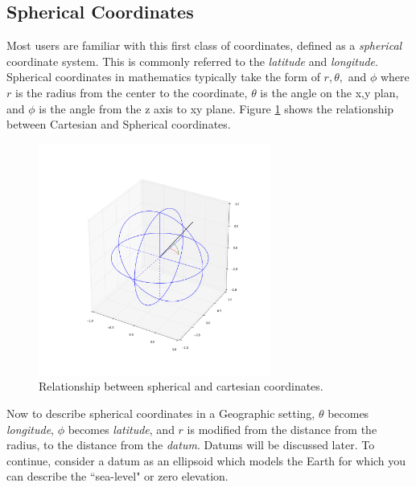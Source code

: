 %


\subsection*{Spherical Coordinates}

Most users are familiar with this first class of coordinates, defined as a \emph{spherical}
coordinate system.  This is commonly referred to the \emph{latitude} and \emph{longitude}.
Spherical coordinates in mathematics typically take the form of $r, \theta,$ and $\phi$ where
$r$ is the radius from the center to the coordinate, $\theta$ is the angle on the x,y plan,
and $\phi$ is the angle from the z axis to xy plane.  Figure \ref{fig:figure_1_2} shows
the relationship between Cartesian and Spherical coordinates. 

\begin{figure}[h!]
\includegraphics[width=3in]{chapter1/diagrams/figure_1_2.png}
\caption{Relationship between spherical and cartesian coordinates.}
\label{fig:figure_1_2}
\end{figure}

Now to describe spherical coordinates in a Geographic setting, 
$\theta$ becomes \emph{longitude}, $\phi$ becomes \emph{latitude}, and 
$r$ is modified from the distance from the radius, to the distance from the
\emph{datum}.  Datums will be discussed later.  To continue, consider 
a datum as an ellipsoid which models the Earth for which you can describe
the ``sea-level" or zero elevation.  

